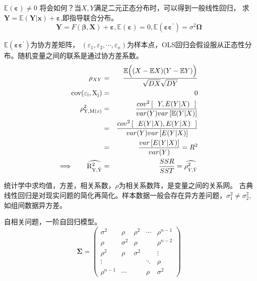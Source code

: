  $ \mathbb{E}(\boldsymbol{\varepsilon}) \neq  0 $ 将会如何？当$ X,Y $满足二元正态分布时，可以得到一般线性回归，
 求 $ \boldsymbol{Y = \mathbb{E}(Y|x) + \varepsilon }$,即指导联合分布。
$$ \boldsymbol{Y} = F(\boldsymbol{\beta,X}) + \boldsymbol{\varepsilon} , \mathbb{E}(\boldsymbol{\varepsilon}) =  0,  
		\mathbb{E}(\boldsymbol{\varepsilon \varepsilon^{\prime}}) = \sigma^2 \boldsymbol{\Omega}  $$

  $ \mathbb{E} (\boldsymbol{\varepsilon \varepsilon^{\prime}} )$为协方差矩阵，
$ (\varepsilon_1,\varepsilon_2,\cdots,\varepsilon_n) $为样本点，OLS回归会假设服从正态性分布。随机变量之间的联系是通过协方差系数。
\begin{eqnarray}
	\rho_{XY}  & = & \frac{\mathbb{E}\Big((X-\mathbb{E}X)(Y-\mathbb{E}Y)\Big)}{\sqrt{DX}\sqrt{DY}} \notag \\
	\rm cov(\varepsilon_{i},X_{j} ) & = & 0 \notag \\ 
	\rm \rho_{Y,M({\it x})} ^2 & = &\frac{cov^2 \left [ \ \ {Y},E(Y|X) \ \  \right ] }{ var(Y)var\left [ \mathbb{E} (Y|X)\right ]} \notag \\ 
	& =  & \frac{cov^2 \left [ \ \ E(Y|X) ,E(Y|X) \ \  \right ] }{ var(Y)var\left [ E(Y|X)\right ]} \notag \\
	& =  & \frac{var\left [ E(Y|X)\right ] }{ var(Y)} = R^2 \notag \\
	\Longrightarrow \qquad \rm \widehat{R_{Y,\hat{Y}}^2} & =  &  \frac{SSR}{SST}  = \widehat{\rho_{Y,\hat{Y}}^2} 
\end{eqnarray}
 

统计学中求均值，方差，相关系数，$ \rho $为相关系数阵，是变量之间的关系网。
古典线性回归是对现实问题的简化再简化。样本数据一般会存在异方差问题，$ \sigma^2_1 \neq \sigma^2_2 $,如组间数据异方差。

自相关问题，一阶自回归模型。
\begin{displaymath}
	\boldsymbol{\Sigma} =\left(
	\begin{array}{ccccc}
	\sigma^{2} & \rho & \rho^{2} & \cdots & \rho^{n-1} \\ 
	\rho & \sigma^{2} & \rho & & \rho^{n-2} \\ 
	\rho^{2} & \rho & \sigma^{2} & & \vdots \\ 
	\vdots & & & \ddots & \rho \\ \rho^{n-1} & \cdots & & \rho & \sigma^{2}
	\end{array}  \right)
\end{displaymath}

